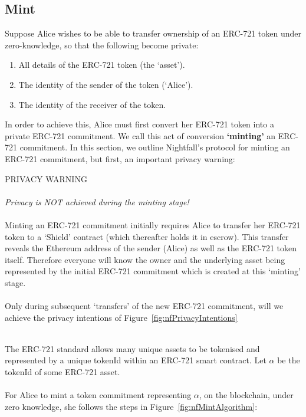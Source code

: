 \subsection{Mint}
\label{sec:721Mint}

Suppose Alice wishes to be able to transfer ownership of an ERC-721 token under zero-knowledge, so that the following become private:

\begin{center}
  \begin{framed}
    \begin{enumerate}
      \item All details of the ERC-721 token (the `asset').
      \item The identity of the sender of the token (`Alice').
      \item The identity of the receiver of the token.
    \end{enumerate}
  \end{framed}
\end{center}

In order to achieve this, Alice must first convert her ERC-721 token into a private ERC-721 commitment. We call this act of conversion \textbf{`minting'} an ERC-721 commitment.
In this section, we outline Nightfall's protocol for minting an ERC-721 commitment, but first, an important privacy warning:

\begin{center}
  \begin{mdframed}[backgroundcolor=verylightred]
    \noindent
    PRIVACY WARNING\\
    \\
    \textit{
    Privacy is NOT achieved during the minting stage!
    }\\
    \\
    Minting an ERC-721 commitment initially requires Alice to transfer her ERC-721 token to a `Shield' contract (which thereafter holds it in escrow). This transfer reveals the Ethereum address of the sender (Alice) as well as the ERC-721 token itself. Therefore everyone will know the owner and the underlying asset being represented by the initial ERC-721 commitment which is created at this `minting' stage.\\
    \\
    Only during subsequent `transfers' of the new ERC-721 commitment, will we achieve the privacy intentions of Figure~\ref{fig:nfPrivacyIntentions}
  \end{mdframed}
\end{center}
\ \\
The ERC-721 standard allows many unique assets to be tokenised and represented by a unique tokenId within an ERC-721 smart contract.
Let $\alpha$ be the tokenId of some ERC-721 asset.\\
\\
For Alice to mint a token commitment representing $\alpha$, on the blockchain, under zero knowledge, she follows the steps in Figure~\ref{fig:nfMintAlgorithm}:

